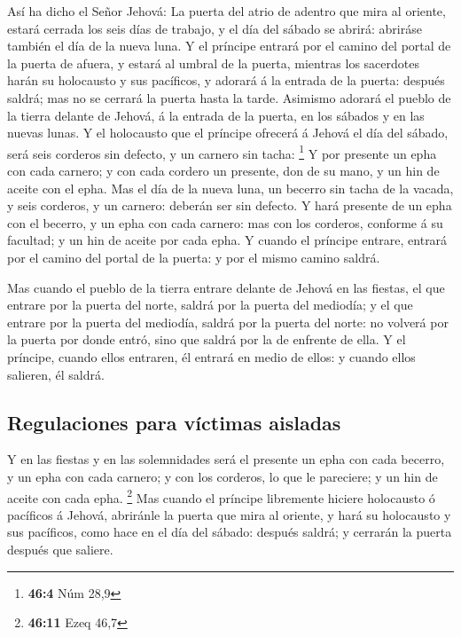  Así ha dicho el Señor Jehová: La puerta del atrio de
adentro que mira al oriente, estará cerrada los seis días de trabajo, y
el día del sábado se abrirá: abriráse también el día de la nueva luna.
 Y el príncipe entrará por el camino del portal de la
puerta de afuera, y estará al umbral de la puerta, mientras los
sacerdotes harán su holocausto y sus pacíficos, y adorará á la entrada
de la puerta: después saldrá; mas no se cerrará la puerta hasta la
tarde.  Asimismo adorará el pueblo de la tierra delante de
Jehová, á la entrada de la puerta, en los sábados y en las nuevas lunas.
 Y el holocausto que el príncipe ofrecerá á Jehová el día
del sábado, será seis corderos sin defecto, y un carnero sin tacha:
\footnote{\textbf{46:4} Núm 28,9}  Y por presente un epha
con cada carnero; y con cada cordero un presente, don de su mano, y un
hin de aceite con el epha.  Mas el día de la nueva luna,
un becerro sin tacha de la vacada, y seis corderos, y un carnero:
deberán ser sin defecto.  Y hará presente de un epha con
el becerro, y un epha con cada carnero: mas con los corderos, conforme á
su facultad; y un hin de aceite por cada epha.  Y cuando
el príncipe entrare, entrará por el camino del portal de la puerta: y
por el mismo camino saldrá.

 Mas cuando el pueblo de la tierra entrare delante de
Jehová en las fiestas, el que entrare por la puerta del norte, saldrá
por la puerta del mediodía; y el que entrare por la puerta del mediodía,
saldrá por la puerta del norte: no volverá por la puerta por donde
entró, sino que saldrá por la de enfrente de ella.  Y el
príncipe, cuando ellos entraren, él entrará en medio de ellos: y cuando
ellos salieren, él saldrá.

\hypertarget{regulaciones-para-vuxedctimas-aisladas}{%
\subsection{Regulaciones para víctimas
aisladas}\label{regulaciones-para-vuxedctimas-aisladas}}

 Y en las fiestas y en las solemnidades será el presente
un epha con cada becerro, y un epha con cada carnero; y con los
corderos, lo que le pareciere; y un hin de aceite con cada epha.
\footnote{\textbf{46:11} Ezeq 46,7}  Mas cuando el
príncipe libremente hiciere holocausto ó pacíficos á Jehová, abriránle
la puerta que mira al oriente, y hará su holocausto y sus pacíficos,
como hace en el día del sábado: después saldrá; y cerrarán la puerta
después que saliere.

